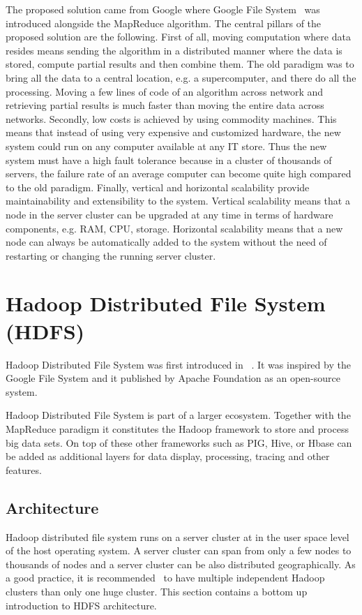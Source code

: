 \documentclass{sig-alternate}
\begin{document}
The proposed solution came from Google where Google File System~\cite{google1} was introduced alongside the MapReduce algorithm.
The central pillars of the proposed solution are the following.
First of all, moving computation where data resides means sending the algorithm in a distributed manner where the data is stored, compute partial results and then combine them. The old paradigm was to bring all the data to a central location, e.g. a supercomputer, and there do all the processing. Moving a few lines of code of an algorithm across network and retrieving partial results is much faster than moving the entire data across networks.
Secondly, low costs is achieved by using commodity machines. This means that instead of using very expensive and customized hardware, the new system could run on any computer available at any IT store. Thus the new system must have a high fault tolerance because in a cluster of thousands of servers, the failure rate of an average computer can become quite high compared to the old paradigm.
Finally, vertical and horizontal scalability provide maintainability and extensibility to the system. Vertical scalability means that a node in the server cluster can be upgraded at any time in terms of hardware components, e.g. RAM, CPU, storage. Horizontal scalability means that a new node can always be automatically added to the system without the need of restarting or changing the running server cluster.


\section{Hadoop Distributed File System (HDFS)}
Hadoop Distributed File System was first introduced in ~\cite{hadoop1}.
It was inspired by the Google File System and it published by Apache Foundation as an open-source system.

Hadoop Distributed File System is part of a larger ecosystem.
Together with the MapReduce paradigm it constitutes the Hadoop framework to store and process big data sets. On top of these other frameworks such as PIG, Hive, or Hbase can be added as additional layers for data display, processing, tracing and other features. 

\subsection{Architecture}
Hadoop distributed file system runs on a server cluster at in the user space level of the host operating system. A server cluster can span from only a few nodes to thousands of nodes and a server cluster can be also distributed geographically. As a good practice, it is recommended~\cite{hadoop1} to have multiple independent Hadoop clusters than only one huge cluster. This section contains a bottom up introduction to HDFS architecture. 
\end{document}

